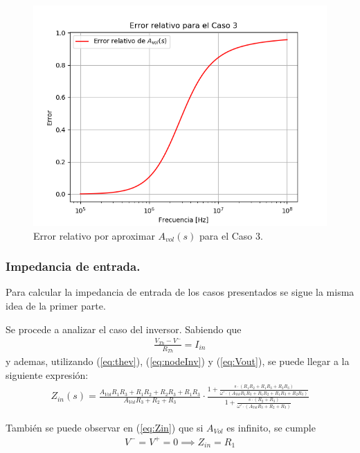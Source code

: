 \begin{figure}[H]	
	\centering
	\includegraphics[width=\textwidth]{Ejercicio1/Imagenes/error3_noinv.png}
	\caption{Error relativo por aproximar $A_{vol}(s)$ para el Caso 3.}
\end{figure}

\subsubsection{Impedancia de entrada.}

Para calcular la impedancia de entrada de los casos presentados se sigue la misma idea de la primer parte.

Se procede a analizar el caso del inversor. Sabiendo que
\begin{align}
\label{eq:Zin}
\frac{V_{Th} - V^-}{R_{Th}}=I_{in}
\end{align}
y ademas, utilizando (\ref{eq:thev}), (\ref{eq:nodeInv}) y (\ref{eq:Vout}), se puede llegar a la siguiente expresión:
\begin{align}
	Z_{in}(s)=\frac{A_{Vol}R_1R_3+R_1R_2+R_2R_3+R_1R_3}{A_{Vol}R_3+R_2+R_3}\cdot \frac{1+\frac{s\cdot (R_1R_2+R_1R_3+R_2R_3)}{\omega ' \cdot (A_{Vol}R_1R_3+R_1R_2+R_1R_3+R_2R_3)}}{1+\frac{s\cdot (R_2+R_3)}{\omega ' \cdot(A_{Vol}R_3+R_2+R_3)}}
\end{align}

También se puede observar en (\ref{eq:Zin}) que si $A_{Vol}$ es infinito, se cumple
\begin{align} V^- = V^+=0 \implies Z_{in}=R_1
\end{align}

